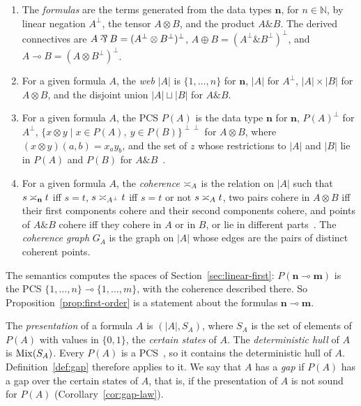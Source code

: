 \begin{definition}
\label{def:mall}
\begin{enumerate}
  \item[(i)] The \emph{formulas} are the terms generated from the data
  types $\mathbf{n}$, for $n \in \mathbb{N}$, by linear negation
  $A^{\perp}$, the tensor $A \otimes B$, and the product
  $A \mathbin{\&} B$. The derived connectives are
  $A \parr B = (A^{\perp} \otimes B^{\perp})^{\perp}$,
  $A \oplus B = (A^{\perp} \mathbin{\&} B^{\perp})^{\perp}$, and
  $A \multimap B = (A \otimes B^{\perp})^{\perp}$.
  \item[(ii)] For a given formula $A$, the \emph{web} $|A|$ is
  $\{1, \dots, n\}$ for $\mathbf{n}$, $|A|$ for $A^{\perp}$,
  $|A| \times |B|$ for $A \otimes B$, and the disjoint union
  $|A| \sqcup |B|$ for $A \mathbin{\&} B$.
  \item[(iii)] For a given formula $A$, the PCS $P(A)$ is the data type
  $\mathbf{n}$ for $\mathbf{n}$, $P(A)^{\perp}$ for $A^{\perp}$,
  $\{ x \otimes y \mid x \in P(A),\ y \in P(B) \}^{\perp\perp}$ for
  $A \otimes B$, where $(x \otimes y)(a, b) = x_a y_b$, and the set of
  $z$ whose restrictions to $|A|$ and $|B|$ lie in $P(A)$ and $P(B)$ for
  $A \mathbin{\&} B$~\cite{danos-ehrhard2011}.
  \item[(iv)] For a given formula $A$, the \emph{coherence} $\mathrel{\asymp}_A$ is
  the relation on $|A|$ such that $s \mathrel{\asymp}_{\mathbf{n}} t$ iff $s = t$,
  $s \mathrel{\asymp}_{A^{\perp}} t$ iff $s = t$ or not $s \mathrel{\asymp}_A t$, two pairs cohere
  in $A \otimes B$ iff their first components cohere and their second
  components cohere, and points of $A \mathbin{\&} B$ cohere iff they
  cohere in $A$ or in $B$, or lie in different parts~\cite{girard1987}.
  The \emph{coherence graph} $G_A$ is the graph on $|A|$ whose edges are
  the pairs of distinct coherent points.
\end{enumerate}
\end{definition}

\noindent
The semantics computes the spaces of Section~\ref{sec:linear-first}:
$P(\mathbf{n} \multimap \mathbf{m})$ is the PCS
$\{1, \dots, n\} \multimap \{1, \dots, m\}$, with
the coherence described there. So Proposition~\ref{prop:first-order} is
a statement about the formulas
$\mathbf{n} \multimap \mathbf{m}$.

The \emph{presentation} of a formula $A$ is $(|A|, S_A)$, where $S_A$ is
the set of elements of $P(A)$ with values in $\{0,1\}$, the
\emph{certain states} of $A$. The \emph{deterministic hull} of $A$ is
$\mathrm{Mix}(S_A)$.
Every $P(A)$ is a PCS~\cite{danos-ehrhard2011}, so it
contains the deterministic hull of $A$. Definition~\ref{def:gap}
therefore applies to it. We say that $A$ has a \emph{gap}
if $P(A)$ has a gap over the certain states of $A$, that is, if the
presentation of $A$ is not sound for $P(A)$ (Corollary~\ref{cor:gap-law}).


